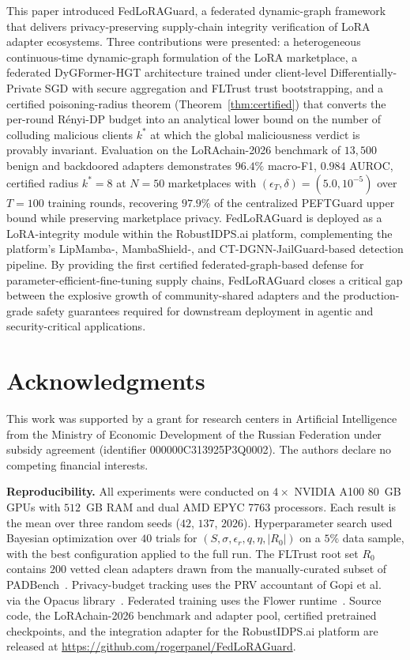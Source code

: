 \documentclass[12pt,a4paper]{article}
\theoremstyle{definition}
\theoremstyle{remark}
\newcommand{\modelname}{FedLoRAGuard}
\newcommand{\benchname}{LoRAchain-2026}
\begin{document}
This paper introduced \modelname{}, a federated dynamic-graph framework that delivers privacy-preserving supply-chain integrity verification of LoRA adapter ecosystems. Three contributions were presented: a heterogeneous continuous-time dynamic-graph formulation of the LoRA marketplace, a federated DyGFormer-HGT architecture trained under client-level Differentially-Private SGD with secure aggregation and FLTrust trust bootstrapping, and a certified poisoning-radius theorem (Theorem~\ref{thm:certified}) that converts the per-round R\'enyi-DP budget into an analytical lower bound on the number of colluding malicious clients $k^*$ at which the global maliciousness verdict is provably invariant. Evaluation on the \benchname{} benchmark of $13{,}500$ benign and backdoored adapters demonstrates $96.4\%$ macro-F1, $0.984$ AUROC, certified radius $k^* = 8$ at $N = 50$ marketplaces with $(\epsilon_T, \delta) = (5.0, 10^{-5})$ over $T = 100$ training rounds, recovering $97.9\%$ of the centralized PEFTGuard upper bound while preserving marketplace privacy. \modelname{} is deployed as a LoRA-integrity module within the RobustIDPS.ai platform, complementing the platform's LipMamba-, MambaShield-, and CT-DGNN-JailGuard-based detection pipeline. By providing the first certified federated-graph-based defense for parameter-efficient-fine-tuning supply chains, \modelname{} closes a critical gap between the explosive growth of community-shared adapters and the production-grade safety guarantees required for downstream deployment in agentic and security-critical applications.


\section*{Acknowledgments}

This work was supported by a grant for research centers in Artificial Intelligence from the Ministry of Economic Development of the Russian Federation under subsidy agreement (identifier 000000C313925P3Q0002). The authors declare no competing financial interests.

\noindent\textbf{Reproducibility.} All experiments were conducted on $4 \times$ NVIDIA A100 80~GB GPUs with $512$~GB RAM and dual AMD EPYC 7763 processors. Each result is the mean over three random seeds ($42$, $137$, $2026$). Hyperparameter search used Bayesian optimization over $40$ trials for $(S, \sigma, \epsilon_r, q, \eta, |R_0|)$ on a $5\%$ data sample, with the best configuration applied to the full run. The FLTrust root set $R_0$ contains $200$ vetted clean adapters drawn from the manually-curated subset of PADBench~\cite{sun2025peftguard}. Privacy-budget tracking uses the PRV accountant of Gopi et al.~\cite{gopi2021numerical} via the Opacus library~\cite{yousefpour2021opacus}. Federated training uses the Flower runtime~\cite{beutel2020flower}. Source code, the \benchname{} benchmark and adapter pool, certified pretrained checkpoints, and the integration adapter for the RobustIDPS.ai platform are released at \url{https://github.com/rogerpanel/FedLoRAGuard}.
\end{document}
